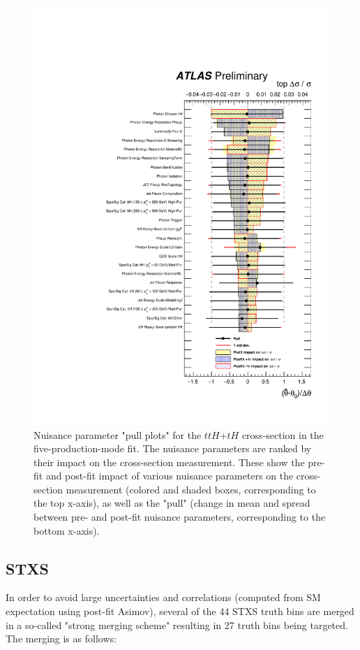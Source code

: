 \begin{figure}[htbp]
  \centering
  \includegraphics[width=0.9\linewidth]{figures/couplings_chapter/pulls_mu_top}
  \caption{Nuisance parameter "pull plots" for the $ttH$+$tH$ cross-section in the five-production-mode fit. The nuisance parameters are ranked by their impact on the cross-section measurement. These show the pre-fit and post-fit impact of various nuisance parameters on the cross-section measurement (colored and shaded boxes, corresponding to the top x-axis), as well as the "pull" (change in mean and spread between pre- and post-fit nuisance parameters, corresponding to the bottom x-axis).}
  \label{fig:ranking_top}
\end{figure}


\subsection{STXS} \label{sec:STXS}

In order to avoid large uncertainties and correlations (computed from SM expectation using post-fit Asimov), several of the 44 STXS truth bins are merged in a so-called "strong merging scheme" resulting in 27 truth bins being targeted. The merging is as follows:

